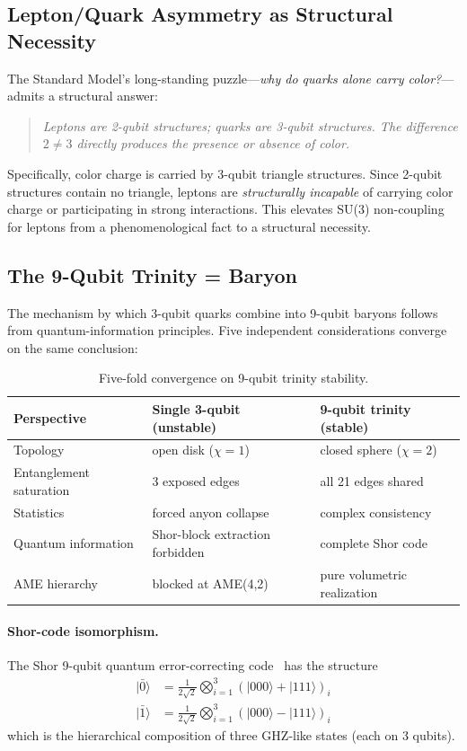 \documentclass[11pt,a4paper]{article}
\begin{document}
\subsection{Lepton/Quark Asymmetry as Structural Necessity}

The Standard Model's long-standing puzzle---\textit{why do quarks alone carry color?}---admits a structural answer:
\begin{quote}
\textit{Leptons are 2-qubit structures; quarks are 3-qubit structures. The difference $2 \neq 3$ directly produces the presence or absence of color.}
\end{quote}

Specifically, color charge is carried by 3-qubit triangle structures. Since 2-qubit structures contain no triangle, leptons are \emph{structurally incapable} of carrying color charge or participating in strong interactions. This elevates SU(3) non-coupling for leptons from a phenomenological fact to a structural necessity.

\subsection{The 9-Qubit Trinity = Baryon}

The mechanism by which 3-qubit quarks combine into 9-qubit baryons follows from quantum-information principles. Five independent considerations converge on the same conclusion:

\begin{table}[h]
\centering
\small
\begin{tabular}{lll}
\toprule
\textbf{Perspective} & \textbf{Single 3-qubit (unstable)} & \textbf{9-qubit trinity (stable)} \\
\midrule
Topology & open disk ($\chi = 1$) & closed sphere ($\chi = 2$) \\
Entanglement saturation & 3 exposed edges & all 21 edges shared \\
Statistics & forced anyon collapse & complex consistency \\
Quantum information & Shor-block extraction forbidden & complete Shor code \\
AME hierarchy & blocked at AME(4,2) & pure volumetric realization \\
\bottomrule
\end{tabular}
\caption{Five-fold convergence on 9-qubit trinity stability.}
\end{table}

\paragraph{Shor-code isomorphism.}
The Shor 9-qubit quantum error-correcting code~\cite{Shor1995} has the structure
\begin{align}
|\bar{0}\rangle &= \frac{1}{2\sqrt{2}}\bigotimes_{i=1}^{3}(|000\rangle + |111\rangle)_i \\
|\bar{1}\rangle &= \frac{1}{2\sqrt{2}}\bigotimes_{i=1}^{3}(|000\rangle - |111\rangle)_i
\end{align}
which is the hierarchical composition of three GHZ-like states (each on 3 qubits).
\end{document}
